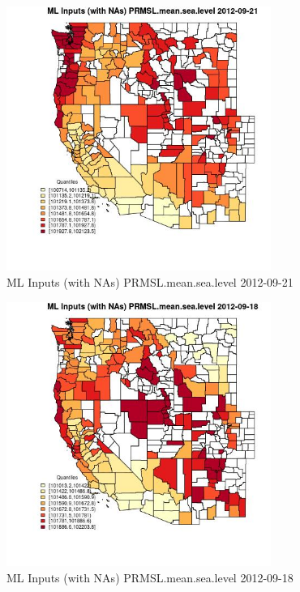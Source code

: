 \clearpage 

\begin{figure} 
\centering  
\includegraphics[width=0.77\textwidth]{Code_Outputs/Report_ML_input_PM25_Step4_part_e_de_duplicated_aves_compiled_2019-05-14wNAs_CountyPRMSLmeansealevelMean2012-09-21_2012-09-21.jpg} 
\caption{\label{fig:Report_ML_input_PM25_Step4_part_e_de_duplicated_aves_compiled_2019-05-14wNAsCountyPRMSLmeansealevelMean2012-09-21_2012-09-21}ML Inputs (with NAs) PRMSL.mean.sea.level 2012-09-21} 
\end{figure} 
 

\begin{figure} 
\centering  
\includegraphics[width=0.77\textwidth]{Code_Outputs/Report_ML_input_PM25_Step4_part_e_de_duplicated_aves_compiled_2019-05-14wNAs_CountyPRMSLmeansealevelMean2012-09-18_2012-09-18.jpg} 
\caption{\label{fig:Report_ML_input_PM25_Step4_part_e_de_duplicated_aves_compiled_2019-05-14wNAsCountyPRMSLmeansealevelMean2012-09-18_2012-09-18}ML Inputs (with NAs) PRMSL.mean.sea.level 2012-09-18} 
\end{figure} 
 

